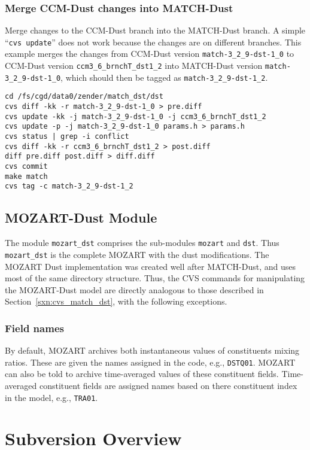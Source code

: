 \documentclass[12pt,twoside]{article}
\begin{document}
\subsubsection[Merge CCM-Dust into MATCH-Dust]{Merge CCM-Dust changes into MATCH-Dust}
Merge changes to the CCM-Dust branch into the MATCH-Dust branch.  
A simple ``\texttt{cvs update}'' does not work because the changes are
on different branches.
This example merges the changes from CCM-Dust version
\verb'match-3_2_9-dst-1_0' to CCM-Dust version
\verb'ccm3_6_brnchT_dst1_2' into MATCH-Dust version
\verb'match-3_2_9-dst-1_0', which should then be tagged as
\verb'match-3_2_9-dst-1_2'. 
\begin{verbatim}
cd /fs/cgd/data0/zender/match_dst/dst
cvs diff -kk -r match-3_2_9-dst-1_0 > pre.diff
cvs update -kk -j match-3_2_9-dst-1_0 -j ccm3_6_brnchT_dst1_2
cvs update -p -j match-3_2_9-dst-1_0 params.h > params.h
cvs status | grep -i conflict
cvs diff -kk -r ccm3_6_brnchT_dst1_2 > post.diff
diff pre.diff post.diff > diff.diff
cvs commit
make match
cvs tag -c match-3_2_9-dst-1_2
\end{verbatim}

\subsection{MOZART-Dust Module}\label{sxn:cvs_mozart_dst}
The module \verb'mozart_dst' comprises the sub-modules \verb'mozart' and
\verb'dst'. 
Thus \verb'mozart_dst' is the complete MOZART with the dust modifications. 
The MOZART Dust implementation was created well after MATCH-Dust, and
uses most of the same directory structure.
Thus, the CVS commands for manipulating the MOZART-Dust model are
directly analogous to those described in Section~\ref{sxn:cvs_match_dst},
with the following exceptions.

\subsubsection[Field names]{Field names}
By default, MOZART archives both instantaneous values of constituents
mixing ratios. 
These are given the names assigned in the code, e.g., \verb'DSTQ01'.
MOZART can also be told to archive time-averaged values of these
constituent fields.
Time-averaged constituent fields are assigned names based on there
constituent index in the model, e.g., \verb'TRA01'.

\section{Subversion Overview}\label{sxn:svn}
\end{document}
